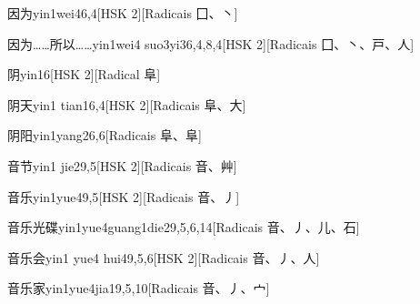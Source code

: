 \begin{entry}{因为}{yin1wei4}{6,4}[HSK 2][Radicais ⼞、⼂]
\end{entry}

\begin{entry}{因为……所以……}{yin1wei4 suo3yi3}{6,4,8,4}[HSK 2][Radicais ⼞、⼂、⼾、⼈]
\end{entry}

\begin{entry}{阴}{yin1}{6}[HSK 2][Radical ⾩]
\end{entry}

\begin{entry}{阴天}{yin1 tian1}{6,4}[HSK 2][Radicais ⾩、⼤]
\end{entry}

\begin{entry}{阴阳}{yin1yang2}{6,6}[Radicais ⾩、⾩]
\end{entry}

\begin{entry}{音节}{yin1 jie2}{9,5}[HSK 2][Radicais ⾳、⾋]
\end{entry}

\begin{entry}{音乐}{yin1yue4}{9,5}[HSK 2][Radicais ⾳、⼃]
\end{entry}

\begin{entry}{音乐光碟}{yin1yue4guang1die2}{9,5,6,14}[Radicais ⾳、⼃、⼉、⽯]
\end{entry}

\begin{entry}{音乐会}{yin1 yue4 hui4}{9,5,6}[HSK 2][Radicais ⾳、⼃、⼈]
\end{entry}

\begin{entry}{音乐家}{yin1yue4jia1}{9,5,10}[Radicais ⾳、⼃、⼧]
\end{entry}

